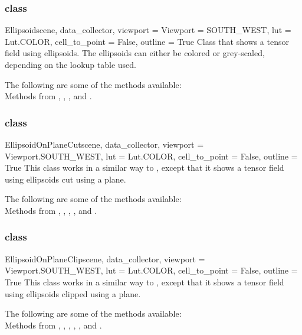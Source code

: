 \subsubsection{\Ellipsoid class}

\begin{classdesc}{Ellipsoid}{scene, data_collector, 
viewport = Viewport = SOUTH_WEST, lut = Lut.COLOR, cell_to_point = False,
outline = True}
Class that shows a tensor field using ellipsoids. The ellipsoids can either be 
colored or grey-scaled, depending on the lookup table used. 
\end{classdesc}

The following are some of the methods available:\\
Methods from \ActorThreeD, \Sphere, \TensorGlyph, \MaskPoints and 
\DataSetMapper.

\subsubsection{\EllipsoidOnPlaneCut class}

\begin{classdesc}{EllipsoidOnPlaneCut}{scene, data_collector,
viewport = Viewport.SOUTH_WEST, lut = Lut.COLOR, cell_to_point = False,
outline = True}
This class works in a similar way to \MapOnPlaneCut, except that it shows
a tensor field using ellipsoids cut using a plane.
\end{classdesc}

The following are some of the methods available:\\
Methods from \ActorThreeD, \Sphere, \TensorGlyph, \Transform,
\MaskPoints and \DataSetMapper.

\subsubsection{\EllipsoidOnPlaneClip class}

\begin{classdesc}{EllipsoidOnPlaneClip}{scene, data_collector,
viewport = Viewport.SOUTH_WEST, lut = Lut.COLOR, cell_to_point = False, 
outline = True}
This class works in a similar way to \MapOnPlaneClip, except that it shows a 
tensor field using ellipsoids clipped using a plane.
\end{classdesc}
        
The following are some of the methods available:\\
Methods from \ActorThreeD, \Sphere, \TensorGlyph, \Transform, \Clipper,
\MaskPoints and \DataSetMapper.


